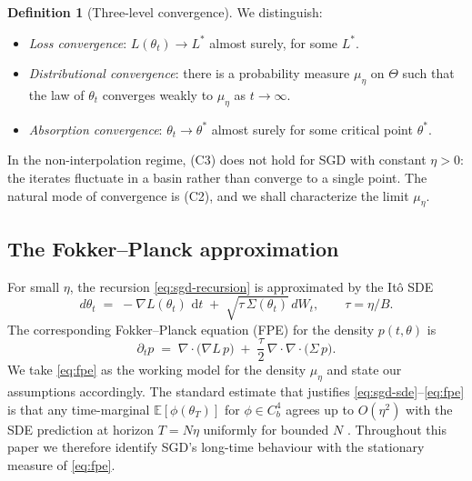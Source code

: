 \documentclass[11pt,a4paper]{article}
\theoremstyle{definition}
\newtheorem{definition}[theorem]{Definition}
\theoremstyle{remark}
\newcommand{\E}{\mathbb{E}}
\newcommand{\dif}{\,\mathrm{d}}
\begin{document}
\begin{definition}[Three-level convergence]\label{def:three-level}
   We distinguish:
   \begin{itemize}[leftmargin=2em]
   \item[\textbf{(C1)}] \emph{Loss convergence}: $L(\theta_t) \to L^*$
                       almost surely, for some $L^*$.
   \item[\textbf{(C2)}] \emph{Distributional convergence}: there is a
                       probability measure $\mu_\eta$ on $\Theta$ such that
                       the law of $\theta_t$ converges weakly to
                       $\mu_\eta$ as $t \to \infty$.
   \item[\textbf{(C3)}] \emph{Absorption convergence}: $\theta_t\to\theta^*$
                       almost surely for some critical point $\theta^*$.
   \end{itemize}
\end{definition}

In the non-interpolation regime, (C3) does not hold for SGD with constant
$\eta>0$: the iterates fluctuate in a basin rather than converge to a
single point.  The natural mode of convergence is (C2), and we shall
characterize the limit $\mu_\eta$.

\subsection{The Fokker--Planck approximation}

For small $\eta$, the recursion \eqref{eq:sgd-recursion} is approximated
\cite{LiTaiE2017,MandtHoffmanBlei2017,SmithLe2018} by the It\^o SDE
\begin{equation}\label{eq:sgd-sde}
   d\theta_t \;=\; -\nabla L(\theta_t)\,\dif t
                  \;+\;\sqrt{\tau\,\Sigma(\theta_t)}\,dW_t,
   \qquad \tau = \eta/B.
\end{equation}
The corresponding Fokker--Planck equation (FPE) for the density $p(t,\theta)$ is
\begin{equation}\label{eq:fpe}
   \partial_t p \;=\;
       \nabla\!\cdot\!\bigl(\nabla L\,p\bigr)
   \;+\; \frac{\tau}{2}\,
       \nabla\!\cdot\!\nabla\!\cdot\!\bigl(\Sigma\,p\bigr).
\end{equation}
We take \eqref{eq:fpe} as the working model for the density $\mu_\eta$ and
state our assumptions accordingly.  The standard estimate that justifies
\eqref{eq:sgd-sde}--\eqref{eq:fpe} is that any time-marginal
$\E[\phi(\theta_T)]$ for $\phi\in C^4_b$ agrees up to $O(\eta^2)$ with the
SDE prediction at horizon $T = N\eta$ uniformly for bounded $N$
\cite{LiTaiE2017}.  Throughout this paper we therefore identify SGD's
long-time behaviour with the stationary measure of \eqref{eq:fpe}.
\end{document}
